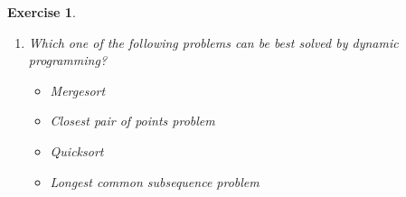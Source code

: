 \documentclass{article}
\newtheorem*{Exercise}{Exercise}
\begin{document}
\begin{Exercise}
\begin{enumerate}
        word[i] represents the i-th character of the word.\par
        Which one of the following statements is FALSE?\par
        \begin{itemize}
            \item The edit distance between intention and execution is 5.
            \item When i is less than the length of  word 1, dp[i][0] = i.
            \item When word1[i - 1] and word2[j - 1] are not equal, $dp[i][j] \ = \ min \left\{ dp[i - 1][j],  dp[i][j - 1] \right\} + 1$.
            \item When two words have the same suffix, the edit distance remains unchanged after removing the suffix.
        \end{itemize}
        \item Which one of the following problems can be best solved by dynamic programming?
        \begin{itemize}
            \item Mergesort
            \item Closest pair of points problem
            \item Quicksort
            \item Longest common subsequence problem
        \end{itemize}
    \end{enumerate}
\end{Exercise}

\hspace*{\fill}\par
\end{document}
